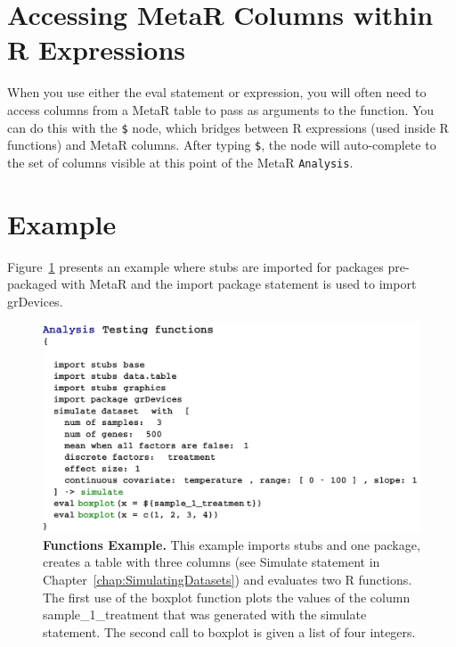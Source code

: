 \section{Accessing MetaR Columns within R Expressions}\label{sec:AccessingMetaRColumns}
When you use either the eval statement or expression, you will often need to access columns from a MetaR table to pass as arguments to the function. You can do this with the \texttt{\$} node, which bridges between R expressions (used inside R functions) and MetaR columns. After typing \texttt{\$}, the node will auto-complete to the set of columns visible at this point of the MetaR \texttt{Analysis}. 


\section{Example}
Figure~\ref{fig:TestinFunctionsExample} presents an example where stubs are imported for packages pre-packaged with MetaR and the import package statement is used to import grDevices.
\begin{figure}[h!tbp]
  \centering
  \includegraphics[width=\figWidthWide]{figures/TestinFunctionsExample.pdf}
\caption[Functions Example.]{\textbf{Functions Example.} This example imports stubs and one package, creates a table with three columns (see Simulate statement in Chapter~\ref{chap:SimulatingDatasets}) and evaluates two R functions. The first use of the boxplot function plots the values of the column sample_1_treatment that was generated with the simulate statement. The second call to boxplot is given a list of four integers.}
\label{fig:TestinFunctionsExample}
\end{figure}


